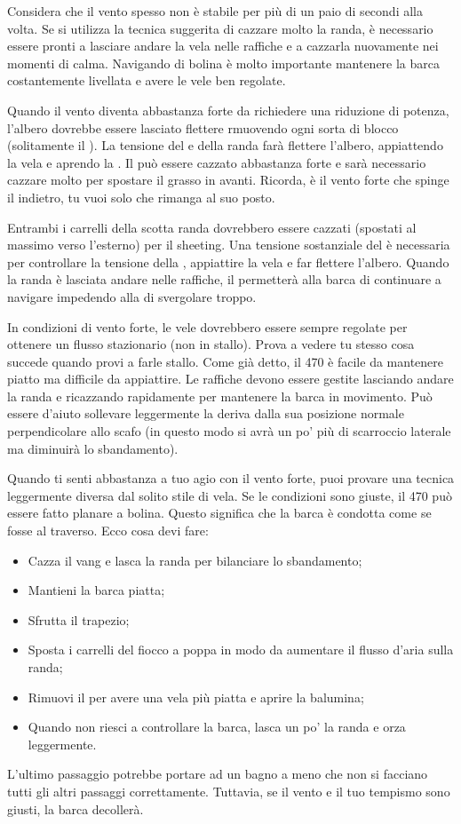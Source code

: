 Considera che il vento spesso non è stabile per più di un paio di secondi alla
volta. Se si utilizza la tecnica suggerita di cazzare molto la randa, è
necessario essere pronti a lasciare andare la vela nelle raffiche e a cazzarla
nuovamente nei momenti di calma. Navigando di bolina è molto importante
mantenere la barca costantemente livellata e avere le vele ben regolate.

Quando il vento diventa abbastanza forte da richiedere una riduzione di potenza,
l'albero dovrebbe essere lasciato flettere rmuovendo ogni sorta di blocco
(solitamente il \mastpull). La tensione del \vang e della \sheet randa farà
flettere l'albero, appiattendo la vela e aprendo la \leech. Il \outhaul può
essere cazzato abbastanza forte e sarà necessario cazzare molto \cunningham per
spostare il grasso in avanti. Ricorda, è il vento forte che spinge il \draft
indietro, tu vuoi solo che rimanga al suo posto.

Entrambi i carrelli della scotta randa dovrebbero essere cazzati (spostati al
massimo verso l'esterno) per il \vang sheeting. Una tensione sostanziale del
\vang è necessaria per controllare la tensione della \leech, appiattire la vela
e far flettere l'albero. Quando la randa è lasciata andare nelle raffiche, il
\vang permetterà alla barca di continuare a navigare impedendo alla \leech di
svergolare troppo.

In condizioni di vento forte, le vele dovrebbero essere sempre regolate per
ottenere un flusso stazionario (non in stallo). Prova a vedere tu stesso cosa
succede quando provi a farle stallo. Come già detto, il 470 è facile da
mantenere piatto ma difficile da appiattire. Le raffiche devono essere gestite
lasciando andare la randa e ricazzando rapidamente per mantenere la barca in
movimento. Può essere d'aiuto sollevare leggermente la deriva dalla sua
posizione normale perpendicolare allo scafo (in questo modo si avrà un po' più
di scarroccio laterale ma diminuirà lo sbandamento).

Quando ti senti abbastanza a tuo agio con il vento forte, puoi provare una
tecnica leggermente diversa dal solito stile di vela. Se le condizioni sono
giuste, il 470 può essere fatto planare a bolina. Questo significa che la barca
è condotta come se fosse al traverso. Ecco cosa devi fare:
\begin{itemize}
      \item Cazza il vang e lasca la randa per bilanciare lo sbandamento;
      \item Mantieni la barca piatta;
      \item Sfrutta il trapezio;
      \item Sposta i carrelli del fiocco a poppa in modo da aumentare il flusso
            d'aria sulla randa;
      \item Rimuovi il \mastpull per avere una vela più piatta e aprire la balumina;
      \item Quando non riesci a controllare la barca, lasca un po' la randa e orza
            leggermente.
\end{itemize}
L'ultimo passaggio potrebbe portare ad un bagno a meno che non si facciano tutti
gli altri passaggi correttamente. Tuttavia, se il vento e il tuo tempismo sono
giusti, la barca decollerà.

